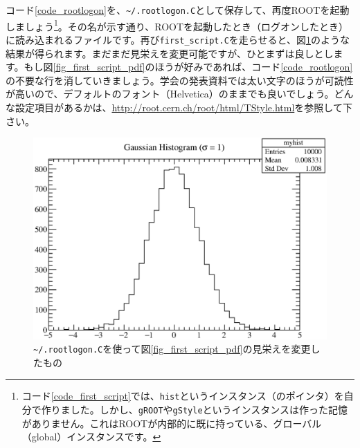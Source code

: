 コード\ref{code_rootlogon}を、\texttt{\~{}/.rootlogon.C}として保存して、再度ROOTを起動しましょう\footnote{コード\ref{code_first_script}では、\texttt{hist}というインスタンス（のポインタ）を自分で作りました。しかし、\texttt{gROOT}や\texttt{gStyle}というインスタンスは作った記憶がありません。これはROOTが内部的に既に持っている、グローバル（global）インスタンスです。}。その名が示す通り、ROOTを起動したとき（ログオンしたとき）に読み込まれるファイルです。再び\texttt{first\_script.C}を走らせると、図\ref{fig_first_script_mod_eps}のような結果が得られます。まだまだ見栄えを変更可能ですが、ひとまずは良しとします。もし図\ref{fig_first_script_pdf}のほうが好みであれば、コード\ref{code_rootlogon}の不要な行を消していきましょう。学会の発表資料では太い文字のほうが可読性が高いので、デフォルトのフォント（Helvetica）のままでも良いでしょう。どんな設定項目があるかは、\url{http://root.cern.ch/root/html/TStyle.html}を参照して下さい。



\begin{figure}
  \centering
  \includegraphics[width=12cm,clip]{fig/first_script_mod.eps}
  \caption{\texttt{\~{}/.rootlogon.C}を使って図\ref{fig_first_script_pdf}の見栄えを変更したもの}
  \label{fig_first_script_mod_eps}
\end{figure}
